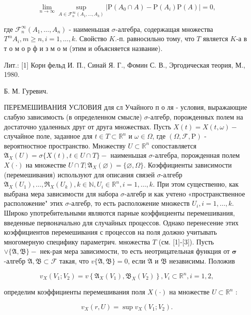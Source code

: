 \documentclass[10pt]{article}
\begin{document}
\[

\lim _{n \rightarrow \infty} \sup _{A \in \mathscr{F}_{n}^{\infty}\left(A_{1}, \ldots, A_{k}\right)}\left|\mathrm{P}\left(A_{0} \cap A\right)-\mathrm{P}\left(A_{i}\right) \mathrm{P}(A)\right|=0,

\]



где $\mathscr{F}_{n}^{\infty}\left(A_{1}, \ldots, A_{n}\right)$ - наименьшая $\sigma$-алгебра, содержащая множества $T^{m} A_{i}, m \geqslant n, i=1, \ldots, k$. Свойство $K$.-п. равносильно тому, что $T$ является $K$-а в т о м о р ф и з м о м (этим и объясняется название).



Лит.: [1] Корн фельд И. П., Синай Я. Г., Фомин С. В., Эргодическая теория, М., 1980.



Б. М. Гуревич.



ПЕРЕМЕШИВАНИЯ УСЛОВИЯ для сл Учайного п о ля - условия, выражающие слабую зависимость (в определенном смысле) $\sigma$-алгебр, порожденных полем на достаточно удаленных друг от друга множествах. Пусть $X(t)=X(t, \omega)-$ случайное поле, заданное для $t \in T \subset \mathbb{R}^{n}$ и $\omega \in \Omega$, где $(\Omega, \mathscr{F}, \mathrm{P})$ - вероятностное пространство. Множеству $U \subset \mathbb{R}^{n}$ сопоставляется $\mathfrak{A}_{X}(U)=\sigma\{X(t), t \in U \cap T\}-$ наименьшая $\sigma$-алгебра, порожденная полем $X(\cdot)$ на множестве $U \cap T ; \mathfrak{A}_{X}(\varnothing)=\{\varnothing, \Omega\}$. Коэффициенты зависимости (перемешивания) используют для описания связей $\sigma$-алгебр $\mathfrak{A}_{X}\left(U_{1}\right), \ldots, \mathfrak{\Re}_{X}\left(U_{k}\right), k \in \mathbb{N}, U_{i} \in \mathbb{R}^{n}, i=1, \ldots, k$. При этом существенно, как выбрана мера зависимости для набора $\sigma$-алгебр и как учтено «пространственное расположение" этих $\sigma$-алгебр, то есть расположение множеств $U_{i}, i=1, \ldots, k$. Широко употребительными являются парные коэффициенты перемешивания, введенные первоначально для случайных процессов. Однако перенесение этих коэффициентов перемешивания с процессов на поля должно учитывать многомерную специфику параметрич. множества $T$ (см. [1]-[3]). Пусть $\vee\{\mathfrak{A}, \mathfrak{B}\}-$ нек-рая мера зависимости, то есть неотрицательная функция от $\boldsymbol{\sigma}$-алгебр $\mathfrak{A}, \mathfrak{B} \subset \mathcal{F}$ такая, что $v\{\mathfrak{A}, \mathfrak{B}\}=0$, если $\mathfrak{A}$ и $\mathfrak{B}$ независимы. Положив



\[

v_{X}\left(V_{1} ; V_{2}\right)=v\left\{\mathfrak{A}_{X}\left(V_{1}\right), \mathfrak{B}_{X}\left(V_{2}\right)\right\}, V_{i} \subset \mathbb{R}^{n}, i=1,2,

\]



определим коэффициенты перемешивания поля $X(\cdot)$ на множестве $U \subset \mathbb{R}^{n}$ :



\[

v_{X}(r, U)=\sup v_{X}\left(V_{1} ; V_{2}\right) .

\]
\end{document}
